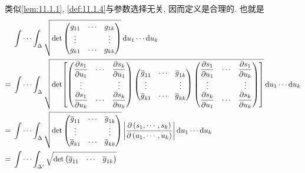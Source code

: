 \begin{definition}
类似\cref{lem:11.1.1}, \cref{def:11.1.4}与参数选择无关, 因而定义是合理的. 也就是
\begin{align*}
  & \idotsint_{\Delta} \sqrt{\operatorname{det}\begin{pmatrix}
      g_{11} & \cdots & g_{1 k} \\
      \vdots & & \vdots \\
      g_{k 1} & \cdots & g_{k k}
    \end{pmatrix}}\,\mathrm{d} u_{1} \cdots \mathrm{d} u_{k} \\
  ={} & \idotsint_{\Delta} \sqrt{\operatorname{det}\!\left[\begin{pmatrix}
      \dfrac{\partial s_{1}}{\partial u_{1}} & \cdots & \dfrac{\partial s_{k}}{\partial u_{1}} \\
      \vdots & & \vdots \\
      \dfrac{\partial s_{1}}{\partial u_{k}} & \cdots & \dfrac{\partial s_{k}}{\partial u_{k}}
    \end{pmatrix}
    \begin{pmatrix}
      \overline{g}_{11} & \cdots & \overline{g}_{1 k} \\
      \vdots & & \vdots \\
      \overline{g}_{k 1} & \cdots & \overline{g}_{k k}
    \end{pmatrix}
    \begin{pmatrix}
      \dfrac{\partial s_{1}}{\partial u_{1}} & \cdots & \dfrac{\partial s_{1}}{\partial u_{k}} \\
      \vdots & & \vdots \\
      \dfrac{\partial s_{k}}{\partial u_{1}} & \cdots & \dfrac{\partial s_{k}}{\partial u_{k}}
    \end{pmatrix}\right]}\,\mathrm{d} u_{1} \cdots \mathrm{d} u_{k} \\
  ={} & \idotsint_{\Delta} \sqrt{\operatorname{det}\begin{pmatrix}
      \overline{g}_{11} & \cdots & \overline{g}_{1 k} \\
      \vdots & & \vdots \\
      \overline{g}_{k 1} & \cdots & \overline{g}_{k k}
    \end{pmatrix}}\left|\frac{\partial\left(s_{1}, \cdots, s_{k}\right)}{\partial\left(u_{1}, \cdots, u_{k}\right)}\right| \mathrm{d} u_{1} \cdots \mathrm{d} u_{k} \\
  ={} & \idotsint_{\Delta^{\prime}} \sqrt{\operatorname{det}\begin{pmatrix}
      \overline{g}_{11} & \cdots & \overline{g}_{1 k} \\

\end{pmatrix}}
\end{align*}
\end{definition}
